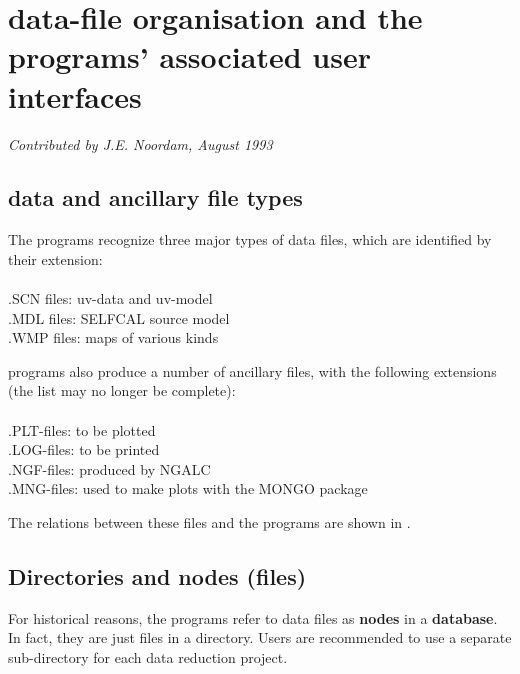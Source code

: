 %
%
%
\chapter{ \NEWSTAR data-file organisation and the programs' associated user
interfaces} 

{\centering \it Contributed by J.E. Noordam, August 1993} 

\tableofcontents 


\section{\NEWSTAR data and ancillary file types} 

The \NEWSTAR programs recognize three major types of data files, which are
identified by their extension: 
\\
\\ .SCN files: uv-data and uv-model 
\\ .MDL files: SELFCAL source model 
\\ .WMP files: maps of various kinds 

\NEWSTAR programs also produce a number of ancillary files, with the following
extensions (the list may no longer be complete): 
\\
\\ .PLT-files: to be plotted 
\\ .LOG-files: to be printed 
\\ .NGF-files: produced by NGALC 
\\ .MNG-files: used to make plots with the MONGO package 

	The relations between these files and the \NEWSTAR programs are shown
in . 

 



\section{Directories and nodes (files)} 
\label{.nodes} 

	For historical reasons, the \NEWSTAR programs refer to data files as
{\bf nodes} in a {\bf database}.  In fact, they are just files in a directory. 
Users are recommended to use a separate sub-directory for each data reduction
project. 

